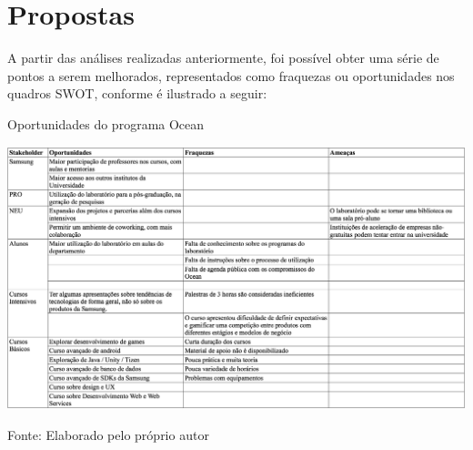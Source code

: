 \chapter{Propostas}
\label{cha:propostas}

A partir das análises realizadas anteriormente, foi possível obter uma série de pontos a serem melhorados, representados como fraquezas ou oportunidades nos quadros SWOT, conforme é ilustrado a seguir:

\begin{landscape}

\begin{table}[h]
\caption{Oportunidades do programa Ocean}
\centerline{\includegraphics[scale=0.3]{img/teste23}}
\label{fig:oportunidadesocean}
\caption* {Fonte: Elaborado pelo próprio autor}
\end{table}

\end{landscape}